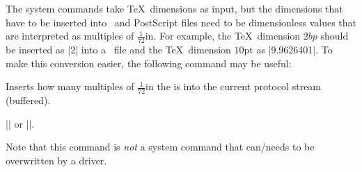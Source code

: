 The system commands take \TeX\ dimensions as input, but the dimensions
that have to be inserted into \pdf\ and PostScript files need to be
dimensionless values that are interpreted as multiples of
$\frac{1}{72}\mathrm{in}$. For example, the \TeX\ dimension $2bp$
should be inserted as |2| into a \pdf\ file and the \TeX\ dimension
$10\mathrm{pt}$ as |9.9626401|. To make this conversion easier, the following
command may be useful:

\begin{command}{\pgf@sys@bp{}}
  Inserts how many multiples of $\frac{1}{72}\mathrm{in}$ the
   is into the current protocol stream (buffered).

  \example |\pgf@sys@bp{\pgf@x}| or |\pgf@sys@bp{1cm}|.
\end{command}

Note that this command is \emph{not} a system command that can/needs
to be overwritten by a driver.

